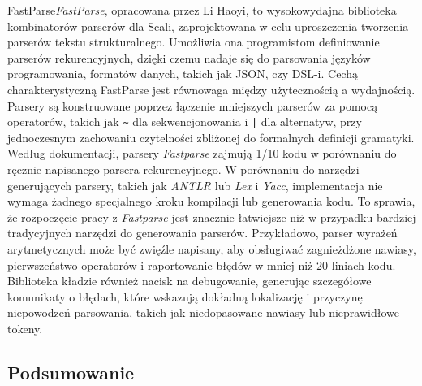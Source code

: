FastParse\textit{FastParse}\cite{fastparse-docs}, opracowana przez Li Haoyi, to wysokowydajna biblioteka kombinatorów parserów dla Scali, zaprojektowana w celu uproszczenia tworzenia parserów tekstu strukturalnego. Umożliwia ona programistom definiowanie parserów rekurencyjnych, dzięki czemu nadaje się do parsowania języków programowania, formatów danych, takich jak JSON, czy DSL-i. Cechą charakterystyczną FastParse jest równowaga między użytecznością a wydajnością. Parsery są konstruowane poprzez łączenie mniejszych parserów za pomocą operatorów, takich jak \verb|~| dla sekwencjonowania i \verb&|& dla alternatyw, przy jednoczesnym zachowaniu czytelności zbliżonej do formalnych definicji gramatyki. Według dokumentacji\cite{fastparse-docs}, parsery \textit{Fastparse} zajmują 1/10 kodu w porównaniu do ręcznie napisanego parsera rekurencyjnego. W porównaniu do narzędzi generujących parsery, takich jak \textit{ANTLR} lub \textit{Lex} i \textit{Yacc}, implementacja nie wymaga żadnego specjalnego kroku kompilacji lub generowania kodu. To sprawia, że rozpoczęcie pracy z \textit{Fastparse} jest znacznie łatwiejsze niż w przypadku bardziej tradycyjnych narzędzi do generowania parserów. Przykładowo, parser wyrażeń arytmetycznych może być zwięźle napisany, aby obsługiwać zagnieżdżone nawiasy, pierwszeństwo operatorów i raportowanie błędów w mniej niż 20 liniach kodu\cite{fastparse-slides}. Biblioteka kładzie również nacisk na debugowanie, generując szczegółowe komunikaty o błędach, które wskazują dokładną lokalizację i przyczynę niepowodzeń parsowania, takich jak niedopasowane nawiasy lub nieprawidłowe tokeny.

\subsection{Podsumowanie}
\label{subsec:podsumowanie}

